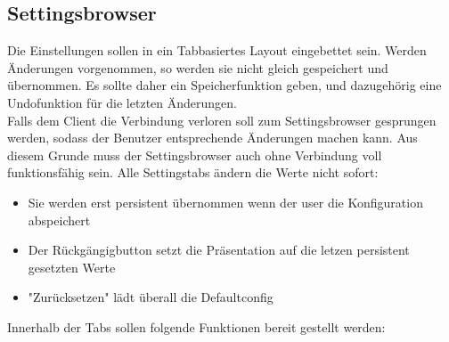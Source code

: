 
\subsection{Settingsbrowser}
Die Einstellungen sollen in ein Tabbasiertes Layout eingebettet sein. 
Werden Änderungen vorgenommen, so werden sie nicht gleich gespeichert und übernommen. 
Es sollte daher ein Speicherfunktion geben, und dazugehörig eine Undofunktion für die letzten Änderungen.
\\
Falls dem Client die Verbindung verloren soll zum Settingsbrowser gesprungen werden, sodass der Benutzer entsprechende
Änderungen machen kann. Aus diesem Grunde muss der Settingsbrowser auch ohne Verbindung voll funktionsfähig sein.
Alle Settingstabs ändern die Werte nicht sofort:
\begin{itemize} 
   \item Sie werden erst persistent übernommen wenn der user die Konfiguration abspeichert
   \item Der Rückgängigbutton setzt die Präsentation auf die letzen persistent gesetzten Werte
   \item "Zurücksetzen" lädt überall die Defaultconfig
\end{itemize}
Innerhalb der Tabs sollen folgende Funktionen bereit gestellt werden:
